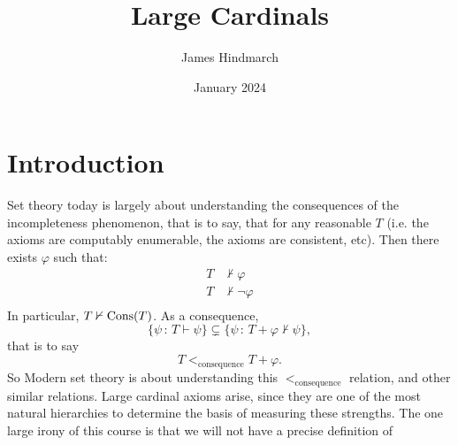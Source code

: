 \documentclass{article}
\title{Large Cardinals}
\author{James Hindmarch}
\date{January 2024}
\begin{document}
\maketitle
\tableofcontents

\newpage
\newlec
\section{Introduction}
Set theory today is largely about understanding the consequences of the incompleteness phenomenon, that is to say, that for any reasonable $T$ (i.e. the axioms are computably enumerable, the axioms are consistent, etc). Then there exists $\varphi$ such that: 
\begin{align*}
    T &\nvdash \varphi\\
    T &\nvdash \neg \varphi\\
\end{align*}
In particular, $T \nvdash \operatorname{Cons}(T)$.
As a consequence, \[ \{ \psi \, : \, T \vdash \psi\} \subsetneq \{ \psi \, : \, T + \varphi \nvdash \psi\},\] that is to say \[ T <_{\text{consequence}} T+ \varphi.\]
So Modern set theory is about understanding this $<_{\text{consequence}}$ relation, and other similar relations. Large cardinal axioms arise, since they are one of the most natural hierarchies to determine the basis of measuring these strengths.\gap 
The one large irony of this course is that we will not have a precise definition of 
\end{document}
